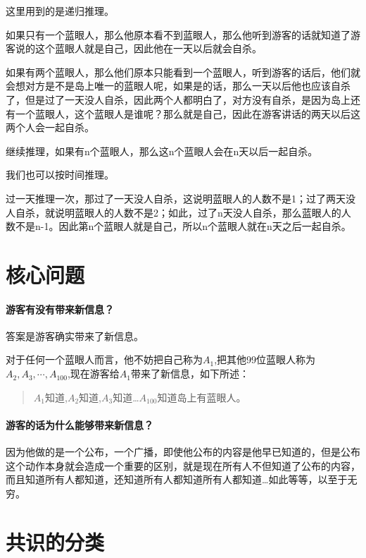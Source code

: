 \documentclass[lang=cn,11pt,a4paper]{elegantpaper}
\begin{document}
这里用到的是递归推理。

如果只有一个蓝眼人，那么他原本看不到蓝眼人，那么他听到游客的话就知道了游客说的这个蓝眼人就是自己，因此他在一天以后就会自杀。

如果有两个蓝眼人，那么他们原本只能看到一个蓝眼人，听到游客的话后，他们就会想对方是不是岛上唯一的蓝眼人呢，如果是的话，那么一天以后他也应该自杀了，但是过了一天没人自杀，因此两个人都明白了，对方没有自杀，是因为岛上还有一个蓝眼人，这个蓝眼人是谁呢？那么就是自己，因此在游客讲话的两天以后这两个人会一起自杀。

继续推理，如果有n个蓝眼人，那么这n个蓝眼人会在n天以后一起自杀。

我们也可以按时间推理。

过一天推理一次，那过了一天没人自杀，这说明蓝眼人的人数不是1；过了两天没人自杀，就说明蓝眼人的人数不是2；如此，过了n天没人自杀，那么蓝眼人的人数不是n-1。因此第n个蓝眼人就是自己，所以n个蓝眼人就在n天之后一起自杀。

\section{核心问题}

\paragraph{游客有没有带来新信息？}

答案是游客确实带来了新信息。

对于任何一个蓝眼人而言，他不妨把自己称为$A_1$,把其他99位蓝眼人称为$A_2,A_3,\cdots,A_{100}$,现在游客给$A_1$带来了新信息，如下所述：

\begin{quote}
$A_1$知道,$A_2$知道,$A_3$知道\ldots $A_{100}$知道岛上有蓝眼人。
\end{quote}

\paragraph{游客的话为什么能够带来新信息？}

因为他做的是一个公布，一个广播，即使他公布的内容是他早已知道的，但是公布这个动作本身就会造成一个重要的区别，就是现在所有人不但知道了公布的内容，而且知道所有人都知道，还知道所有人都知道所有人都知道\ldots 如此等等，以至于无穷。

\section{共识的分类}
\end{document}

